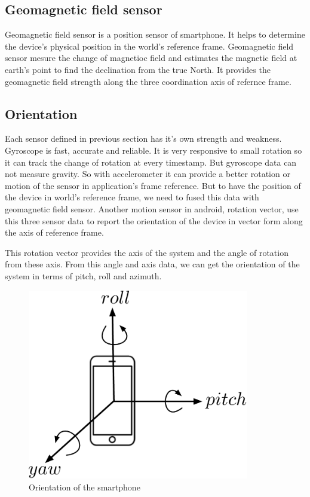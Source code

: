 \subsection{Geomagnetic field sensor}
Geomagnetic field sensor is a position sensor of smartphone.
It helps to determine the device's physical position in the world's reference frame.
Geomagnetic field sensor mesure the change of magnetioc field and estimates the magnetic field at earth's point to find the declination from the true North.
It provides the geomagnetic field strength along the three coordination axis of refernce frame.


\subsection{Orientation}
Each sensor defined in previous section has it's own strength and weakness.
Gyroscope is fast, accurate and reliable.
It is very responsive to small rotation so it can track the change of rotation at every timestamp.
But gyroscope data can not measure gravity.
So with accelerometer it can provide a better rotation or motion of the sensor in application's frame reference.
But to have the position of the device in world's reference frame, we need to fused this data with geomagnetic field sensor.
Another motion sensor in android, rotation vector, use this three sensor data to report the orientation of the device in vector form along the axis of reference frame.

This rotation vector provides the axis of the system and the angle of rotation from these axis.
From this angle and axis data, we can get the orientation of the system in terms of pitch, roll and azimuth.

\begin{figure}
\centering
\includegraphics[width=3.8in]{figures/roll_pitch_yaw.pdf}
\caption{Orientation of the smartphone}
\label{f:rpy_dia}
\end{figure}

